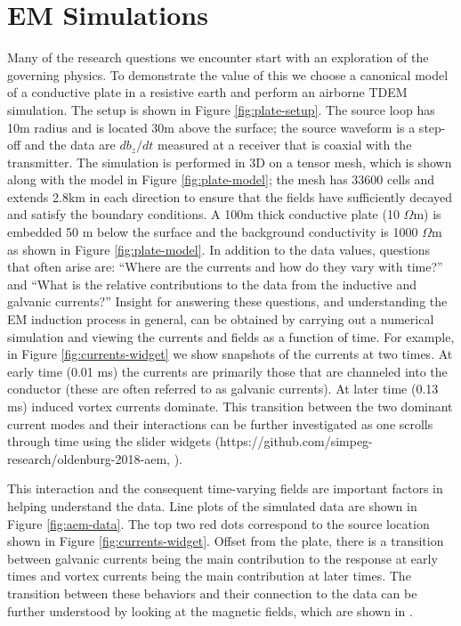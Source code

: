 \documentclass[paper]{geophysics}
\begin{document}
\section{EM Simulations}
Many of the research questions we encounter start with an exploration of the governing physics. To demonstrate the value of this we choose a canonical model of a conductive plate in a resistive earth and perform an airborne TDEM simulation. The setup is shown in Figure \ref{fig:plate-setup}. The source loop has 10m radius and is located 30m above the surface; the source waveform is a step-off and the data are $db_z/dt$ measured at a receiver that is coaxial with the transmitter. The simulation is performed in 3D on a tensor mesh, which is shown along with the model in Figure \ref{fig:plate-model}; the mesh has 33600 cells and extends 2.8km in each direction to ensure that the fields have sufficiently decayed and satisfy the boundary conditions. A 100m thick conductive plate (10 $\Omega$m) is embedded 50 m below the surface and the background conductivity is 1000 $\Omega$m as shown in Figure \ref{fig:plate-model}. In addition to the data values, questions that often arise are: ``Where are the currents and how do they vary with time?'' and ``What is the relative contributions to the data from the inductive and galvanic currents?'' Insight for answering these questions, and understanding the EM induction process in general, can be obtained by carrying out a numerical simulation and viewing the currents and fields as a function of time. For example, in Figure \ref{fig:currents-widget} we show snapshots of the currents at two times. At early time (0.01 ms) the currents are primarily those that are channeled into the conductor (these are often referred to as galvanic currents). At later time (0.13 ms) induced vortex currents dominate. This transition between the two dominant current modes and their interactions can be further investigated as one scrolls through time using the slider widgets (https://github.com/simpeg-research/oldenburg-2018-aem, \cite{kang2018}).













This interaction and the consequent time-varying fields are important factors in helping understand the data. Line plots of the simulated data are shown in Figure \ref{fig:aem-data}. The top two red dots correspond to the source location shown in Figure \ref{fig:currents-widget}. Offset from the plate, there is a transition between galvanic currents being the main contribution to the response at early times and vortex currents being the main contribution at later times. The transition between these behaviors and their connection to the data can be further understood by looking at the magnetic fields, which are shown in \cite{Heagy2018}.
\end{document}
